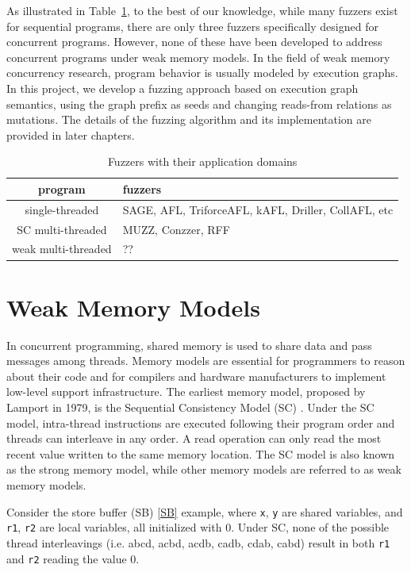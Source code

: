 As illustrated in Table~\ref{fuzzer-domains}, to the best of our knowledge, while many fuzzers exist for sequential programs, there are only three fuzzers specifically designed for concurrent programs. However, none of these have been developed to address concurrent programs under weak memory models. In the field of weak memory concurrency research, program behavior is usually modeled by execution graphs. In this project, we develop a fuzzing approach based on execution graph semantics, using the graph prefix as seeds and changing reads-from relations as mutations. The details of the fuzzing algorithm and its implementation are provided in later chapters.


\begin{table}[h!]
	\centering
	\begin{tabular}{ |c|l| }
		\hline
		program             & fuzzers                                             \\
		\hline
		single-threaded     & SAGE, AFL, TriforceAFL, kAFL, Driller, CollAFL, etc \\
		SC multi-threaded   & MUZZ, Conzzer, RFF                             \\
		weak multi-threaded & ??                                                  \\
		\hline
	\end{tabular}
	\caption{Fuzzers with their application domains}
	\label{fuzzer-domains}
\end{table}

\section{Weak Memory Models}

In concurrent programming, shared memory is used to share data and pass messages among threads. Memory models are essential for programmers to reason about their code and for compilers and hardware manufacturers to implement low-level support infrastructure. The earliest memory model, proposed by Lamport\cite{SC} in 1979, is the Sequential Consistency Model (SC) . Under the SC model, intra-thread instructions are executed following their program order and threads can interleave in any order. A read operation can only read the most recent value written to the same memory location. The SC model is also known as the strong memory model, while other memory models are referred to as weak memory models.

Consider the store buffer (SB) \ref{SB} example, where \texttt{x}, \texttt{y} are shared variables, and \texttt{r1}, \texttt{r2} are local variables, all initialized with 0. Under SC, none of the possible thread interleavings (i.e. abcd, acbd, acdb, cadb, cdab, cabd) result in both \texttt{r1} and \texttt{r2} reading the value 0.

